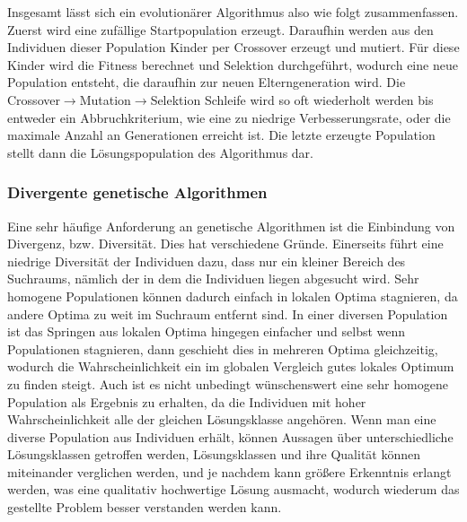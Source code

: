 Insgesamt lässt sich ein evolutionärer Algorithmus also wie folgt zusammenfassen.
Zuerst wird eine zufällige Startpopulation erzeugt.
Daraufhin werden aus den Individuen dieser Population Kinder per Crossover erzeugt und mutiert.
Für diese Kinder wird die Fitness berechnet und Selektion durchgeführt, wodurch eine neue Population entsteht, die daraufhin zur neuen Elterngeneration wird.
Die Crossover$\rightarrow$Mutation$\rightarrow$Selektion Schleife wird so oft wiederholt werden bis entweder ein Abbruchkriterium, wie eine zu niedrige Verbesserungsrate, oder die maximale Anzahl an Generationen erreicht ist.
Die letzte erzeugte Population stellt dann die Lösungspopulation des Algorithmus dar.

\subsubsection{Divergente genetische Algorithmen}

\label{sub:divergentGeneticAlgorithms}

Eine sehr häufige Anforderung an genetische Algorithmen ist die Einbindung von Divergenz, bzw. Diversität.
Dies hat verschiedene Gründe.
Einerseits führt eine niedrige Diversität der Individuen dazu, dass nur ein kleiner Bereich des Suchraums, nämlich der in dem die Individuen liegen abgesucht wird.
Sehr homogene Populationen können dadurch einfach in lokalen Optima stagnieren, da andere Optima zu weit im Suchraum entfernt sind.
In einer diversen Population ist das Springen aus lokalen Optima hingegen einfacher und selbst wenn Populationen stagnieren, dann geschieht dies in mehreren Optima gleichzeitig, wodurch die Wahrscheinlichkeit ein im globalen Vergleich gutes lokales Optimum zu finden steigt.
Auch ist es nicht unbedingt wünschenswert eine sehr homogene Population als Ergebnis zu erhalten, da die Individuen mit hoher Wahrscheinlichkeit alle der gleichen Lösungsklasse angehören.
Wenn man eine diverse Population aus Individuen erhält, können Aussagen über unterschiedliche Lösungsklassen getroffen werden, Lösungsklassen und ihre Qualität können miteinander verglichen werden, und je nachdem kann größere Erkenntnis erlangt werden, was eine qualitativ hochwertige Lösung ausmacht, wodurch wiederum das gestellte Problem besser verstanden werden kann.

